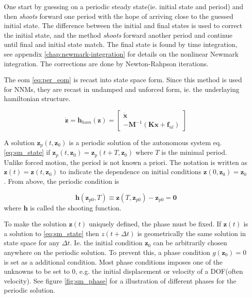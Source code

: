 One start by guessing on a periodic steady state(ie. initial state
and period) and then \textit{shoots} forward one period with the hope of
arriving close to the guessed initial state. The difference between the initial
and final states is used to correct the initial state, and the method
\textit{shoots} forward another period and continue until final and initial
state match.
The final state is found by time integration, see appendix
\ref{chap:newmark-integration} for details on the nonlinear Newmark integration.
The corrections are done by Newton-Rahpson iterations.

The eom \eqref{eq:per_eom} is recast into state space form. Since this method is
used for NNMs, they are recast in undamped and unforced form, ie. the underlaying
hamiltonian structure.

\begin{equation}
  \label{eq:sm_state}
  \dot{\bm z} = \bm h_{ham} (\bm z) =
  \begin{bmatrix}
    \dot{\bm x} \\
    -\bm M^{-1}(\bm K \bm x  + \bm f_{nl})
  \end{bmatrix}
\end{equation}


A solution $\bm z_p(t, \bm z_0)$ is a periodic solution of the autonomous system
eq. \eqref{eq:sm_state} if $\bm z_p(t, \bm z_{0}) = \bm z_p(t+T, \bm z_{0})$
where $T$ is the minimal period. Unlike forced motion, the period is not known a
priori. The notation is written as $\bm z(t)=\bm z(t, \bm z_0)$ to indicate the
dependence on initial conditions $\bm z(0, \bm z_0) = \bm z_0$.
From above, the periodic condition is

\begin{equation}
  \label{eq:sm_per_cond}
  \bm h(\bm z_{p0},T) \equiv \bm z(T, \bm z_{p0}) - \bm z_{p0} = \bm 0
\end{equation}
where $\bm h$ is called the shooting function.


To make the solution $\bm z(t)$ uniquely defined, the phase must be fixed. If
$\bm z(t)$ is a solution to \eqref{eq:sm_state} then $z(t + \Delta t)$ is
geometrically the same solution in state space for any $\Delta t$. Ie. the
initial condition $\bm z_{0}$ can be arbitrarily chosen anywhere on the
periodic solution. To prevent this, a phase condition $g(\bm z_{0})=0$ is set
as a additional condition. Most phase conditions imposes one of the unknowns to
be set to 0, e.g. the initial displacement or velocity of a DOF(often velocity).
See figure \ref{fig:sm_phase} for a illustration of different phases for the
periodic solution.


